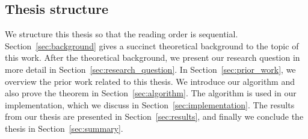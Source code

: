 \subsection{Thesis structure}
We structure this thesis so that the reading order is sequential.
Section~\ref{sec:background} gives a succinct theoretical background to the topic of this work.
After the theoretical background, we present our research question in more detail in Section~\ref{sec:research_question}.
In Section~\ref{sec:prior_work}, we overview the prior work related to this thesis.
We introduce our algorithm and also prove the theorem in Section~\ref{sec:algorithm}.
The algorithm is used in our implementation, which we discuss in Section~\ref{sec:implementation}.
The results from our thesis are presented in Section~\ref{sec:results}, and finally we conclude the thesis in Section~\ref{sec:summary}.

